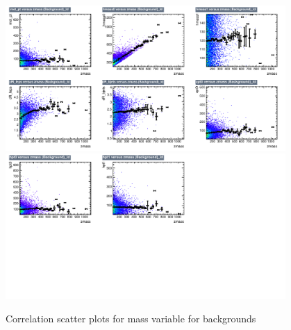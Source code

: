 \begin{figure}[!htb]%
\centering
\includegraphics[width=0.95\textwidth]{figures/CRTT/dataset/plots/correlationscatter_zmass__Id_c3.pdf}
\includegraphics[width=0.95\textwidth]{figures/CRTT/dataset/plots/correlationscatter_zmass__Id_c4.pdf}
\caption{ Correlation scatter plots for \Zll mass variable for backgrounds}%
\label{fig:correlations_CRTT_zmass_BG}                                                       
\end{figure}



